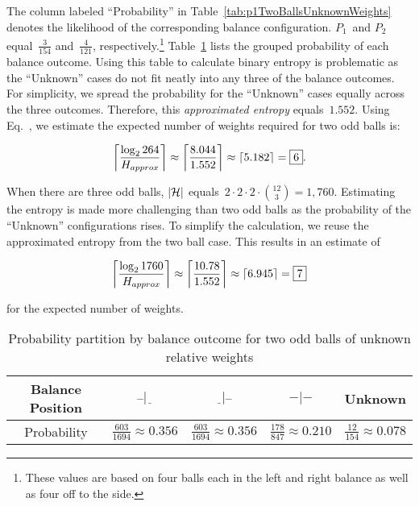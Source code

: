   

  The column labeled ``Probability'' in Table~\ref{tab:p1TwoBallsUnknownWeights} denotes the likelihood of the corresponding balance configuration.  $P_{1}$~and $P_{2}$ equal~$\frac{3}{154}$ and~$\frac{4}{121}$, respectively.\footnote{These values are based on four balls each in the left and right balance as well as four off to the side.}  Table~\ref{tab:twoBallProbabilityBreakdown} lists the grouped probability of each balance outcome.  Using this table to calculate binary entropy is problematic as the ``Unknown'' cases do not fit neatly into any three of the balance outcomes.  For simplicity, we spread the probability for the ``Unknown'' cases equally across the three outcomes.  Therefore, this \textit{approximated entropy} equals~$1.552$.   Using Eq.~, we estimate the expected number of weights required for two odd balls is:

  \[ \ceil*{\frac{\log_{2} 264}{H_{approx}}} \approx \ceil*{\frac{8.044}{1.552}} \approx \ceil*{5.182} = \boxed{6} \text{.} \]

  When there are three odd balls, $\abs{\mathcal{H}}$ equals~${2\cdot2\cdot2\cdot\binom{12}{3} = 1,760}$.  Estimating the entropy is made more challenging than two odd balls as the probability of the ``Unknown'' configurations rises.  To simplify the calculation, we reuse the approximated entropy from the two ball case.  This results in an estimate of

  \[ \ceil*{\frac{\log_{2} 1760}{H_{approx}}} \approx \ceil*{\frac{10.78}{1.552}} \approx \ceil*{6.945} = \boxed{7}\]

  \noindent
  for the expected number of weights.

  \begin{table}
    \centering
    \caption{Probability partition by balance outcome for two odd balls of unknown relative weights}\label{tab:twoBallProbabilityBreakdown}
    \begin{tabular}{|c||c|c|c|c|}
      \hline
      Balance Position & $\bar{~}\bar{~}|\underline{~~}$  & $\underline{~~}|\bar{~}\bar{~}$  & $-|-$ & Unknown \\\hline
      Probability      & $\frac{603}{1694} \approx 0.356$ & $\frac{603}{1694} \approx 0.356$ & $\frac{178}{847} \approx 0.210$ & $\frac{12}{154} \approx 0.078$    \\\hline
    \end{tabular}
  \end{table}

